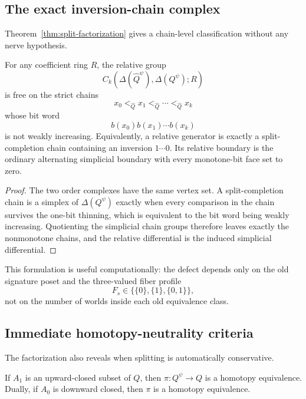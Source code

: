 \subsection{The exact inversion-chain complex}

Theorem~\ref{thm:split-factorization} gives a chain-level classification without
any nerve hypothesis.

\begin{theorem}\label{thm:inversion-chain}
For any coefficient ring $R$, the relative group
\[
 C_k\!\left(\Delta(\widehat Q^\psi),\Delta(Q^\psi);R\right)
\]
is free on the strict chains
\[
 x_0<_{\widehat Q}x_1<_{\widehat Q}\cdots<_{\widehat Q}x_k
\]
whose bit word
\[
 b(x_0)b(x_1)\cdots b(x_k)
\]
is not weakly increasing.  Equivalently, a relative generator is exactly a
split-completion chain containing an inversion $1\cdots0$.  Its relative boundary
is the ordinary alternating simplicial boundary with every monotone-bit face set
to zero.
\end{theorem}

\begin{proof}
The two order complexes have the same vertex set.  A split-completion chain is a
simplex of $\Delta(Q^\psi)$ exactly when every comparison in the chain survives
the one-bit thinning, which is equivalent to the bit word being weakly increasing.
Quotienting the simplicial chain groups therefore leaves exactly the nonmonotone
chains, and the relative differential is the induced simplicial differential.
\end{proof}

This formulation is useful computationally: the defect depends only on the old
signature poset and the three-valued fiber profile
\[
 F_s\in\bigl\{\{0\},\{1\},\{0,1\}\bigr\},
\]
not on the number of worlds inside each old equivalence class.

\subsection{Immediate homotopy-neutrality criteria}

The factorization also reveals when splitting is automatically conservative.

\begin{proposition}\label{prop:monotone-section}
If $A_1$ is an upward-closed subset of $Q$, then $\pi:Q^\psi\to Q$ is a
homotopy equivalence.  Dually, if $A_0$ is downward closed, then $\pi$ is a
homotopy equivalence.
\end{proposition}

